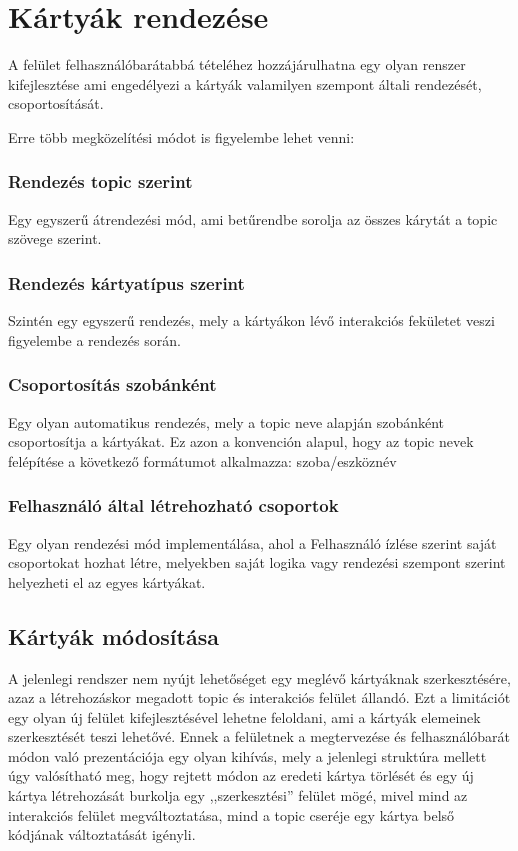 \documentclass[
]{thesis-ekf}
\theoremstyle{definition}
\theoremstyle{remark}
\begin{document}
\section{Kártyák rendezése}
A felület felhasználóbarátabbá tételéhez hozzájárulhatna egy olyan renszer kifejlesztése ami engedélyezi a
kártyák valamilyen szempont általi rendezését, csoportosítását.

Erre több megközelítési módot is figyelembe lehet venni:

\subsubsection{Rendezés topic szerint}
Egy egyszerű átrendezési mód, ami betűrendbe sorolja az összes kárytát a topic szövege szerint.

\subsubsection{Rendezés kártyatípus szerint}
Szintén egy egyszerű rendezés, mely a kártyákon lévő interakciós fekületet veszi figyelembe a rendezés során.

\subsubsection{Csoportosítás szobánként}
Egy olyan automatikus rendezés, mely a topic neve alapján szobánként csoportosítja a kártyákat.
Ez azon a konvención alapul, hogy az topic nevek felépítése a következő formátumot alkalmazza: szoba/eszköznév

\subsubsection{Felhasználó által létrehozható csoportok}
Egy olyan rendezési mód implementálása, ahol a Felhasználó ízlése szerint saját csoportokat hozhat létre, 
melyekben saját logika vagy rendezési szempont szerint helyezheti el az egyes kártyákat.

\subsection{Kártyák módosítása}
A jelenlegi rendszer nem nyújt lehetőséget egy meglévő kártyáknak szerkesztésére, azaz a létrehozáskor megadott
topic és interakciós felület állandó. Ezt a limitációt egy olyan új felület kifejlesztésével
lehetne feloldani, ami a kártyák elemeinek szerkesztését teszi lehetővé. Ennek a felületnek a megtervezése
és felhasználóbarát módon való prezentációja egy olyan kihívás, mely a jelenlegi struktúra mellett
úgy valósítható meg, hogy rejtett módon az eredeti kártya törlését és egy új kártya létrehozását burkolja
egy ,,szerkesztési'' felület mögé, mivel mind az interakciós felület megváltoztatása, mind a topic cseréje
egy kártya belső kódjának változtatását igényli.
\end{document}
